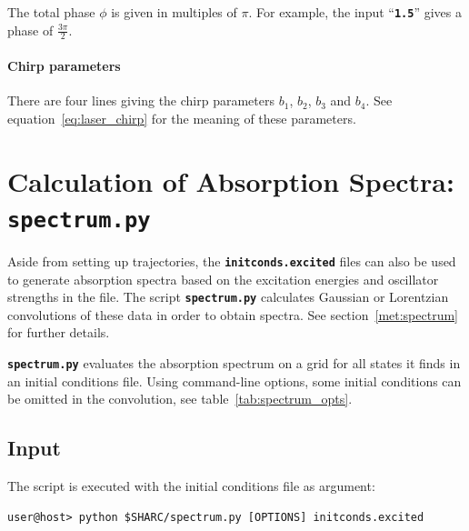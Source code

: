 \documentclass[a4paper,11pt,DIV=15,openany,twoside=false]{scrbook}
\newcommand{\ttt}[1]{\textbf{\texttt{#1}}}
\begin{document}
The total phase $\phi$ is given in multiples of $\pi$. For example, the input ``\ttt{1.5}'' gives a phase of $\frac{3\pi}{2}$.

\paragraph{Chirp parameters}

There are four lines giving the chirp parameters $b_1$, $b_2$, $b_3$ and $b_4$. See equation~\eqref{eq:laser_chirp} for the meaning of these parameters.



\section{Calculation of Absorption Spectra: \ttt{spectrum.py}}\label{sec:spectrum.py}

Aside from setting up trajectories, the \ttt{initconds.excited} files can also be used to generate absorption spectra based on the excitation energies and oscillator strengths in the file. The script \ttt{spectrum.py} calculates Gaussian or Lorentzian convolutions of these data in order to obtain spectra. See section~\ref{met:spectrum} for further details.

\ttt{spectrum.py} evaluates the absorption spectrum on a grid for all states it finds in an initial conditions file. Using command-line options, some initial conditions can be omitted in the convolution, see table~\ref{tab:spectrum_opts}.

\subsection{Input}

The script is executed with the initial conditions file as argument:
\begin{verbatim}
user@host> python $SHARC/spectrum.py [OPTIONS] initconds.excited
\end{verbatim}
\end{document}
